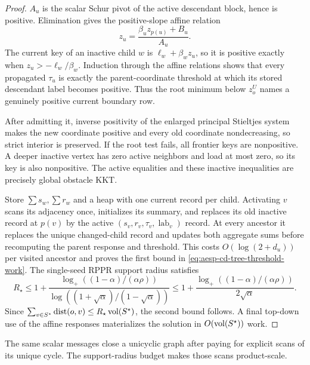 \begin{proof}
$A_u$ is the scalar Schur pivot of the active descendant block, hence is
positive.  Elimination gives the positive-slope affine relation
\begin{equation*}
 z_u=\frac{\beta_u z_{p(u)}+B_u}{A_u}.
\end{equation*}
The current key of an inactive child $w$ is
$\ell_w+\beta_wz_u$, so it is positive exactly when
$z_u>-\ell_w/\beta_w$.  Induction through the affine relations shows that
every propagated $\tau_u$ is exactly the parent-coordinate threshold at
which its stored descendant label becomes positive.  Thus the root minimum
below $z_o^U$ names a genuinely positive current boundary row.

After admitting it, inverse positivity of the enlarged principal Stieltjes
system makes the new coordinate positive and every old coordinate
nondecreasing, so strict interior is preserved.  If the root test fails, all
frontier keys are nonpositive.  A deeper inactive vertex has zero active
neighbors and load at most zero, so its key is also nonpositive.  The active
equalities and these inactive inequalities are precisely global obstacle
KKT.

Store $\sum s_w,\sum r_w$ and a heap with one current record per child.
Activating $v$ scans its adjacency once, initializes its summary, and replaces
its old inactive record at $p(v)$ by the active
$(s_v,r_v,\tau_v,\operatorname{lab}_v)$ record.  At every ancestor it replaces
the unique changed-child record and updates both aggregate sums before
recomputing the parent response and threshold.
This costs $O(\log(2+d_u))$ per visited ancestor and proves the first bound in
\cref{eq:aesp-cd-tree-threshold-work}.  The single-seed RPPR support radius
satisfies
\begin{equation*}
 R_\star\leq1+
 \frac{\log_+((1-\alpha)/(\alpha\rho))}
 {\log((1+\sqrt\alpha)/(1-\sqrt\alpha))}
 \leq1+
 \frac{\log_+((1-\alpha)/(\alpha\rho))}{2\sqrt\alpha}.
\end{equation*}
Since $\sum_{v\in S^\star}\operatorname{dist}(o,v)
\leq R_\star\operatorname{vol}(S^\star)$, the second bound follows.  A final top-down use
of the affine responses materializes the solution in $O(\operatorname{vol}(S^\star))$
work.
\end{proof}

The same scalar messages close a unicyclic graph after paying for explicit
scans of its unique cycle.  The support-radius budget makes those scans
product-scale.

